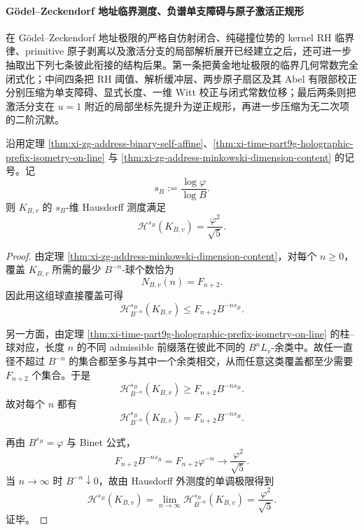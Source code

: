 \paragraph{Gödel--Zeckendorf 地址临界测度、负谱单支障碍与原子激活正规形}
在 Gödel--Zeckendorf 地址极限的严格自仿射闭合、纯碰撞位势的 kernel RH 临界律、primitive 原子剥离以及激活分支的局部解析展开已经建立之后，还可进一步抽取出下列七条彼此衔接的结构后果。第一条把黄金地址极限的临界几何常数完全闭式化；中间四条把 RH 阈值、解析缓冲层、两步原子扇区及其 Abel 有限部校正分别压缩为单支障碍、显式长度、一维 Witt 校正与闭式常数位移；最后两条则把激活分支在 \(u=1\) 附近的局部坐标先提升为逆正规形，再进一步压缩为无二次项的二阶沉默。

\begin{theorem}\label{thm:xi-time-part62d-zg-critical-hausdorff-measure}
沿用定理 \ref{thm:xi-zg-address-binary-self-affine}、\ref{thm:xi-time-part9g-holographic-prefix-isometry-on-line} 与
\ref{thm:xi-zg-address-minkowski-dimension-content} 的记号。记
\[
s_B:=\frac{\log\varphi}{\log B}.
\]
则 \(K_{B,v}\) 的 \(s_B\)-维 Hausdorff 测度满足
\[
\mathcal H^{s_B}(K_{B,v})=\frac{\varphi^2}{\sqrt5}.
\]
\end{theorem}
\begin{proof}
由定理 \ref{thm:xi-zg-address-minkowski-dimension-content}，对每个 \(n\ge 0\)，覆盖 \(K_{B,v}\) 所需的最少 \(B^{-n}\)-球个数恰为
\[
N_{B,v}(n)=F_{n+2}.
\]
因此用这组球直接覆盖可得
\[
\mathcal H_{B^{-n}}^{s_B}(K_{B,v})
\le
F_{n+2}B^{-ns_B}.
\]

另一方面，由定理 \ref{thm:xi-time-part9g-holographic-prefix-isometry-on-line} 的柱--球对应，长度 \(n\) 的不同 admissible 前缀落在彼此不同的 \(B^nL_v\)-余类中。故任一直径不超过 \(B^{-n}\) 的集合都至多与其中一个余类相交，从而任意这类覆盖都至少需要 \(F_{n+2}\) 个集合。于是
\[
\mathcal H_{B^{-n}}^{s_B}(K_{B,v})
\ge
F_{n+2}B^{-ns_B}.
\]
故对每个 \(n\) 都有
\[
\mathcal H_{B^{-n}}^{s_B}(K_{B,v})
=
F_{n+2}B^{-ns_B}.
\]

再由 \(B^{s_B}=\varphi\) 与 Binet 公式，
\[
F_{n+2}B^{-ns_B}=F_{n+2}\varphi^{-n}\longrightarrow \frac{\varphi^2}{\sqrt5}.
\]
当 \(n\to\infty\) 时 \(B^{-n}\downarrow 0\)，故由 Hausdorff 外测度的单调极限得到
\[
\mathcal H^{s_B}(K_{B,v})
=
\lim_{n\to\infty}\mathcal H_{B^{-n}}^{s_B}(K_{B,v})
=
\frac{\varphi^2}{\sqrt5}.
\]
证毕。
\end{proof}

